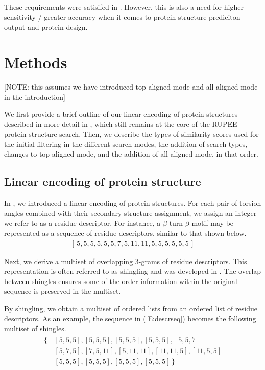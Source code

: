 \documentclass[10pt,letterpaper]{article}
\begin{document}
These requirements were satisifed in \cite{Ayoub2019}. However, this is also a need for higher sensitivity / greater accuracy when it comes to protein structure prediciton output and protein design.  

\section*{Methods}

[NOTE: this assumes we have introduced top-aligned mode and all-aligned mode in the introduction]

We first provide a brief outline of our linear encoding of protein structures described in more detail in \cite{Ayoub2019}, which still remains at the core of the RUPEE protein structure search. 
Then, we describe the types of similarity scores used for the initial filtering in the different search modes, the addition of search types, changes to top-aligned mode, and the addition of all-aligned mode, in that order.

\subsection*{Linear encoding of protein structure}

In \cite{Ayoub2019}, we introduced a linear encoding of protein structures.
For each pair of torsion angles combined with their secondary structure assignment, we assign an integer we refer to as a residue descriptor.
For instance, a $\beta$-turn-$\beta$ motif may be represented as a sequence of residue descriptors, similar to that shown below. 
\begin{gather}\label{E:descrseq} 
    [\, 5, 5, 5, 5, 5, 5, 7, 5, 11, 11, 5, 5, 5, 5, 5, 5 \,]
\end{gather}

Next, we derive a multiset of overlapping 3-grams of residue descriptors. 
This representation is often referred to as shingling and was developed in \cite{Broder1997a}. 
The overlap between shingles ensures some of the order information within the original sequence is preserved in the multiset. 

By shingling, we obtain a multiset of ordered lists from an ordered list of residue descriptors. 
As an example, the sequence in (\ref{E:descrseq}) becomes the following multiset of shingles. 
\begin{align}\label{E:shinglebag}
    \begin{split}
        \{\,&[5, 5, 5], [5, 5, 5], [5, 5, 5], [5, 5, 5], [5, 5, 7] \\
            & [5, 7, 5], [7, 5, 11], [5, 11, 11], [11, 11, 5], [11, 5, 5] \\
            & [5, 5, 5], [5, 5, 5], [5, 5, 5], [5, 5, 5] \,\}
    \end{split}
\end{align}
\end{document}
